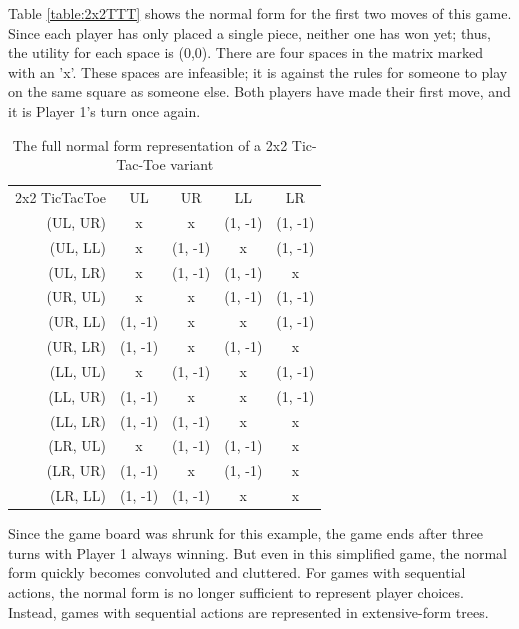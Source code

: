 Table \ref{table:2x2TTT} shows the normal form for the first two moves of this game. Since each player has only placed a single piece, neither one has won yet; thus, the utility for each space is (0,0). There are four spaces in the matrix marked with an 'x'. These spaces are infeasible; it is against the rules for someone to play on the same square as someone else. Both players have made their first move, and it is Player 1's turn once again.\\
\begin{table}[h]
  \centering
  \begin{tabular}{r | c | c | c | c |}
    \multicolumn{1}{c}{2x2 TicTacToe}&\multicolumn{1}{c}{UL}&\multicolumn{1}{c}{UR}&
    \multicolumn{1}{c}{LL}&\multicolumn{1}{c}{LR}\\ \cline{2-5}
    (UL, UR) & x & x & (1, -1) & (1, -1) \\ \cline{2-5}
    (UL, LL) & x & (1, -1) & x & (1, -1) \\ \cline{2-5}
    (UL, LR) & x & (1, -1) & (1, -1) & x \\ \cline{2-5}
    (UR, UL) & x & x & (1, -1) & (1, -1) \\ \cline{2-5}
    (UR, LL) & (1, -1) & x & x & (1, -1) \\ \cline{2-5}
    (UR, LR) & (1, -1) & x & (1, -1) & x \\ \cline{2-5}
    (LL, UL) & x & (1, -1) & x & (1, -1) \\ \cline{2-5}
    (LL, UR) & (1, -1) & x & x & (1, -1) \\ \cline{2-5}
    (LL, LR) & (1, -1) & (1, -1) & x & x \\ \cline{2-5}
    (LR, UL) & x & (1, -1) & (1, -1) & x \\ \cline{2-5}
    (LR, UR) & (1, -1) & x & (1, -1) & x \\ \cline{2-5}
    (LR, LL) & (1, -1) & (1, -1) & x & x \\ \cline{2-5}
  \end{tabular}
  \caption{The full normal form representation of a 2x2 Tic-Tac-Toe variant}
  \label{table:full2x2TTT}
\end{table}

Since the game board was shrunk for this example, the game ends after three turns with Player 1 always winning. But even in this simplified game, the normal form quickly becomes convoluted and cluttered. For games with sequential actions, the normal form is no longer sufficient to represent player choices. Instead, games with sequential actions are represented in extensive-form trees.\\

